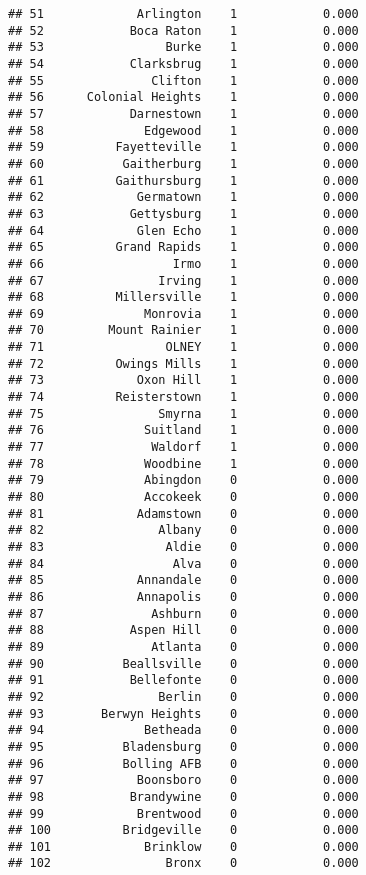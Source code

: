 \documentclass[]{article}
\begin{document}
\begin{verbatim}
## 51             Arlington    1            0.000
## 52            Boca Raton    1            0.000
## 53                 Burke    1            0.000
## 54            Clarksbrug    1            0.000
## 55               Clifton    1            0.000
## 56      Colonial Heights    1            0.000
## 57            Darnestown    1            0.000
## 58              Edgewood    1            0.000
## 59          Fayetteville    1            0.000
## 60           Gaitherburg    1            0.000
## 61          Gaithursburg    1            0.000
## 62             Germatown    1            0.000
## 63            Gettysburg    1            0.000
## 64             Glen Echo    1            0.000
## 65          Grand Rapids    1            0.000
## 66                  Irmo    1            0.000
## 67                Irving    1            0.000
## 68          Millersville    1            0.000
## 69              Monrovia    1            0.000
## 70         Mount Rainier    1            0.000
## 71                 OLNEY    1            0.000
## 72          Owings Mills    1            0.000
## 73             Oxon Hill    1            0.000
## 74          Reisterstown    1            0.000
## 75                Smyrna    1            0.000
## 76              Suitland    1            0.000
## 77               Waldorf    1            0.000
## 78              Woodbine    1            0.000
## 79              Abingdon    0            0.000
## 80              Accokeek    0            0.000
## 81             Adamstown    0            0.000
## 82                Albany    0            0.000
## 83                 Aldie    0            0.000
## 84                  Alva    0            0.000
## 85             Annandale    0            0.000
## 86             Annapolis    0            0.000
## 87               Ashburn    0            0.000
## 88            Aspen Hill    0            0.000
## 89               Atlanta    0            0.000
## 90           Beallsville    0            0.000
## 91            Bellefonte    0            0.000
## 92                Berlin    0            0.000
## 93        Berwyn Heights    0            0.000
## 94              Betheada    0            0.000
## 95           Bladensburg    0            0.000
## 96           Bolling AFB    0            0.000
## 97             Boonsboro    0            0.000
## 98            Brandywine    0            0.000
## 99             Brentwood    0            0.000
## 100          Bridgeville    0            0.000
## 101             Brinklow    0            0.000
## 102                Bronx    0            0.000

\end{verbatim}
\end{document}
